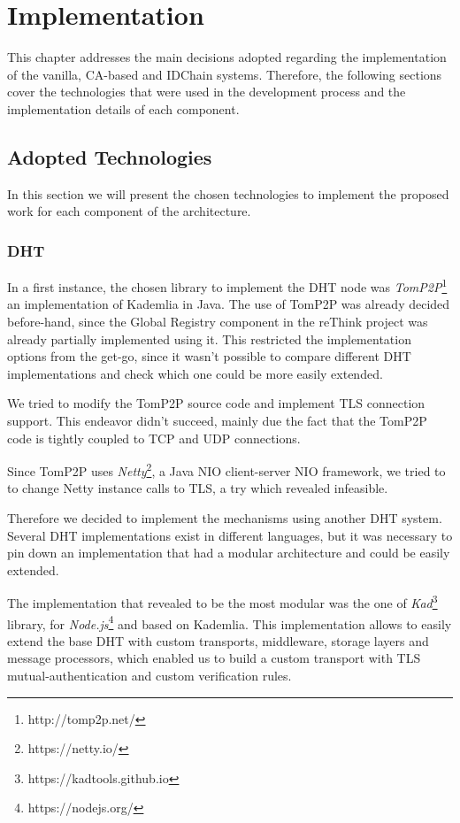 \chapter{Implementation}
\label{chapter:implementation}

This chapter addresses the main decisions adopted regarding the implementation of the vanilla, CA-based and IDChain systems. Therefore, the following sections cover the technologies that were used in the development process and the implementation details of each component.

\section{Adopted Technologies}

In this section we will present the chosen technologies to implement the proposed work for each component of the architecture.

\subsection{DHT}

In a first instance, the chosen library to implement the DHT node was \textit{TomP2P}\footnote{http://tomp2p.net/} an implementation of Kademlia in Java.
The use of TomP2P was already decided before-hand, since the Global Registry component in the reThink project was already partially implemented using it.
This restricted the implementation options from the get-go, since it wasn't possible to compare different \ac{DHT} implementations and check which one could be more easily extended.

We tried to modify the TomP2P source code and implement TLS connection support.
This endeavor didn't succeed, mainly due the fact that the TomP2P code is tightly coupled to TCP and UDP connections.

Since TomP2P uses \textit{Netty}\footnote{https://netty.io/}, a Java NIO client-server \ac{NIO} framework, we tried to to change Netty instance calls to TLS, a try which revealed infeasible.

Therefore we decided to implement the mechanisms using another DHT system.
Several DHT implementations exist in different languages, but it was necessary to pin down an implementation that had a modular architecture and could be easily extended.

The implementation that revealed to be the most modular was the one of \textit{Kad}\footnote{https://kadtools.github.io} library, for \textit{Node.js}\footnote{https://nodejs.org/} and based on Kademlia.
This implementation allows to easily extend the base DHT with custom transports, middleware, storage layers and message processors, which enabled us to build a custom transport with TLS mutual-authentication and custom verification rules.

